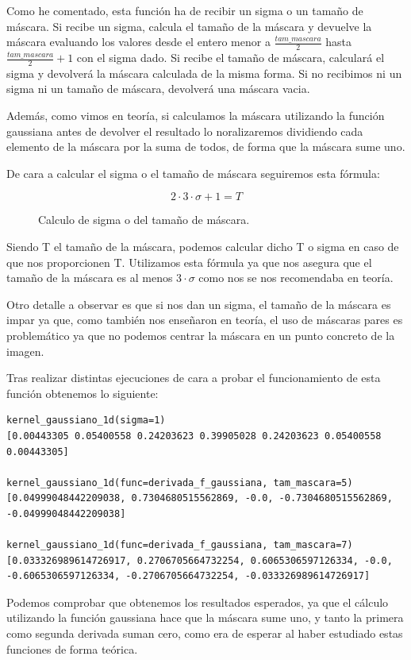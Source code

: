 \documentclass[12pt, spanish]{article}
\begin{document}
Como he comentado, esta función ha de recibir un sigma o un tamaño de máscara. Si recibe un sigma, calcula el tamaño de la máscara y devuelve la máscara evaluando los valores desde el entero menor a $\frac{tam\_mascara}{2}$ hasta $\frac{tam\_mascara}{2} + 1$ con el sigma dado. Si recibe el tamaño de máscara, calculará el sigma y devolverá la máscara calculada de la misma forma. Si no recibimos ni un sigma ni un tamaño de máscara, devolverá una máscara vacia.

Además, como vimos en teoría, si calculamos la máscara utilizando la función gaussiana antes de devolver el resultado lo noralizaremos dividiendo cada elemento de la máscara por la suma de todos, de forma que la máscara sume uno.

De cara a calcular el sigma o el tamaño de máscara seguiremos esta fórmula:


\begin{figure}[H]
	\centering
	\[ 2 \cdot 3 \cdot \sigma + 1 = T\]
	\caption{Calculo de sigma o del tamaño de máscara.}
	\label{sigma_t}
\end{figure}

Siendo T el tamaño de la máscara, podemos calcular dicho T o sigma en caso de que nos proporcionen T. Utilizamos esta fórmula ya que nos asegura que el tamaño de la máscara es al menos $3 \cdot \sigma$ como nos se nos recomendaba en teoría.

Otro detalle a observar es que si nos dan un sigma, el tamaño de la máscara es impar ya que, como también nos enseñaron en teoría, el uso de máscaras pares es problemático ya que no podemos centrar la máscara en un punto concreto de la imagen.

Tras realizar distintas ejecuciones de cara a probar el funcionamiento de esta función obtenemos lo siguiente:

\begin{lstlisting}
kernel_gaussiano_1d(sigma=1)
[0.00443305 0.05400558 0.24203623 0.39905028 0.24203623 0.05400558 0.00443305]

kernel_gaussiano_1d(func=derivada_f_gaussiana, tam_mascara=5)
[0.04999048442209038, 0.7304680515562869, -0.0, -0.7304680515562869, -0.04999048442209038]

kernel_gaussiano_1d(func=derivada_f_gaussiana, tam_mascara=7)
[0.033326989614726917, 0.2706705664732254, 0.6065306597126334, -0.0, -0.6065306597126334, -0.2706705664732254, -0.033326989614726917]
\end{lstlisting}


Podemos comprobar que obtenemos los resultados esperados, ya que el cálculo utilizando la función gaussiana hace que la máscara sume uno, y tanto la primera como segunda derivada suman cero, como era de esperar al haber estudiado estas funciones de forma teórica.
\end{document}
